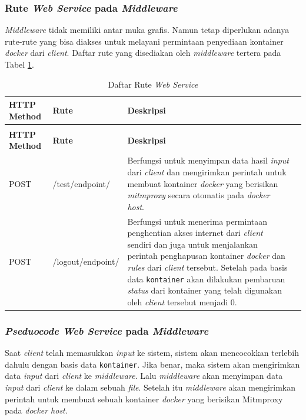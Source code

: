 \subsubsection{Rute \textit{Web Service} pada \textit{Middleware}}
\textit{Middleware} tidak memiliki antar muka grafis. Namun tetap diperlukan adanya rute-rute yang bisa diakses untuk melayani permintaan penyediaan kontainer \textit{docker} dari \textit{client}. Daftar rute yang disediakan oleh \textit{middleware} tertera pada Tabel \ref{tabelRuteWebServiceDockerHost}.\\
\begin{longtable}{|p{}|p{}|p{}|p{}|} %
	
	\caption{Daftar Rute \textit{Web Service}} \label{tabelRuteWebServiceDockerHost} \\
	\hline
	\textbf{HTTP Method} & \textbf{Rute} & \textbf{Deskripsi} \\ \hline
	
	\endfirsthead
	\caption[]{Daftar Rute \textit{Web Service}}  \\
	\hline
	\textbf{HTTP Method} & \textbf{Rute} & \textbf{Deskripsi}  \\ \hline
	
	\endhead
	\endfoot
	\endlastfoot
	
	POST & /test/endpoint/ & Berfungsi untuk menyimpan data hasil \textit{input} dari \textit{client} dan mengirimkan perintah untuk membuat kontainer \textit{docker} yang berisikan \textit{mitmproxy} secara otomatis pada \textit{docker host}.\\ \hline
	POST & /logout/endpoint/ & Berfungsi untuk menerima permintaan penghentian akses internet dari \textit{client} sendiri dan juga untuk menjalankan perintah penghapusan kontainer \textit{docker} dan \textit{rules} dari \textit{client} tersebut. Setelah pada basis data \texttt{kontainer} akan dilakukan pembaruan \textit{status} dari kontainer yang telah digunakan oleh \textit{client} tersebut menjadi 0.\\ \hline
\end{longtable}

\subsubsection{\textit{Pseduocode Web Service} pada \textit{Middleware}}
Saat \textit{client} telah memasukkan \textit{input} ke sistem, sistem akan mencocokkan terlebih dahulu dengan basis data \texttt{kontainer}. Jika benar, maka sistem akan mengirimkan data \textit{input} dari \textit{client} ke \textit{middleware}. Lalu \textit{middleware} akan menyimpan data \textit{input} dari \textit{client} ke dalam sebuah \textit{file}. Setelah itu \textit{middleware} akan mengirimkan perintah untuk membuat sebuah kontainer \textit{docker} yang berisikan Mitmproxy pada \textit{docker host}.

